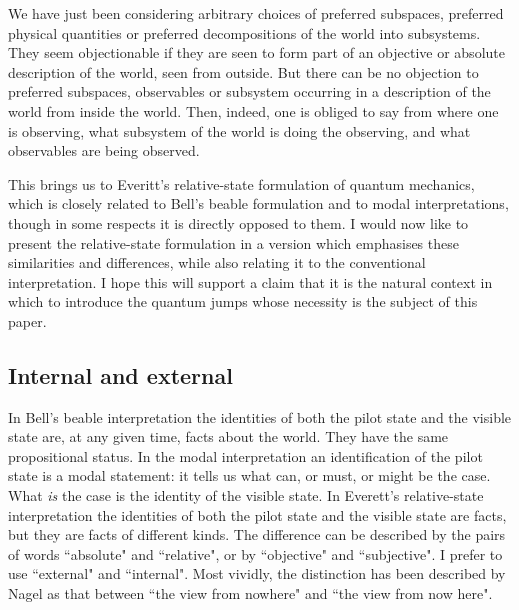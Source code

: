 \documentclass[12pt,a4paper,reqno]{article}
\renewcommand{\(}{\left(}
\renewcommand{\)}{\right)}
\newcommand{\<}{\langle}
\renewcommand{\>}{\rangle}
\theoremstyle{plain} %
\theoremstyle{definition}
\theoremstyle{remark}
\begin{document}
We have just been considering arbitrary choices of preferred
subspaces, preferred physical quantities or preferred decompositions of the world
into subsystems. They seem objectionable if they are seen to form part
of an objective or absolute description of the world, seen from outside.
But there can be no objection to preferred subspaces, observables or
subsystem occurring in a description of the world from inside the world.
Then, indeed, one is obliged to say from where one is observing, what
subsystem of the world is doing the observing, and what observables are
being observed.

This brings us to Everitt's relative-state formulation of quantum
mechanics, which is closely related to Bell's beable formulation and to
modal interpretations, though in some respects it is directly opposed to
them. I would now like to present the relative-state formulation in a 
version which emphasises these similarities and differences, while also
relating it to the conventional interpretation. I hope this will support
a claim that it is the natural context in which to introduce the quantum
jumps whose necessity is the subject of this paper.


\subsection{Internal and external}

In Bell's beable interpretation the identities of both the pilot state 
and the visible state are, at any given time, facts about the world.
They have the same propositional status. In the modal interpretation an
identification of the pilot state is a modal statement: it tells us what
can, or must, or might be the case. What \emph{is} the case is the 
identity of the visible state. In Everett's relative-state
interpretation the identities of both the pilot state and the visible
state are facts, but they are facts of different kinds. The difference
can be described by the pairs of words ``absolute" and ``relative", or
by ``objective" and ``subjective". I prefer to use ``external" and
``internal". Most vividly, the distinction has been described by Nagel
\cite{Nagel:nowhere} as that between ``the view from nowhere" and ``the
view from now here".
\end{document}
